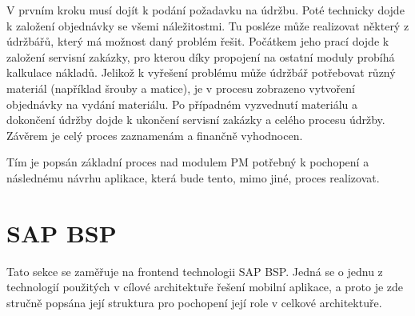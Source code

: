 \documentclass[thesis=M,czech]{FITthesis}[2012/06/26]
\begin{document}
V prvním kroku musí dojít k podání požadavku na údržbu. Poté technicky dojde k založení objednávky se všemi náležitostmi. Tu posléze může realizovat některý z údržbářů, který má možnost daný problém řešit. Počátkem jeho prací dojde k založení servisní zakázky, pro kterou díky propojení na ostatní moduly probíhá kalkulace nákladů. Jelikož k vyřešení problému může údržbář potřebovat různý materiál (například šrouby a matice), je v procesu zobrazeno vytvoření objednávky na vydání materiálu. Po případném vyzvednutí materiálu a dokončení údržby dojde k ukončení servisní zakázky a celého procesu údržby. Závěrem je celý proces zaznamenám a finančně vyhodnocen.

Tím je popsán základní proces nad modulem PM potřebný k pochopení a následnému návrhu aplikace, která bude tento, mimo jiné, proces realizovat.

\section{SAP BSP}
\label{sec:bsp}
Tato sekce se zaměřuje na frontend technologii SAP BSP. Jedná se o jednu z technologií použitých v cílové architektuře řešení mobilní aplikace, a proto je zde stručně popsána její struktura pro pochopení její role v celkové architektuře. 
\end{document}
